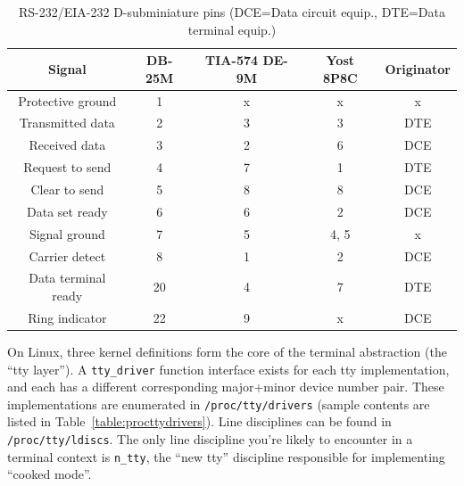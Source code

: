 \begin{table}[!htbp]
  \centering
  \begin{tabular}{ |c|c|c|c|c| }
    \hline
    Signal & DB-25M & TIA-574 DE-9M & Yost 8P8C\cite{yost} & Originator \\
    \hline
    \hline
    Protective ground & 1 & x & x & x \\
    \hline
    Transmitted data & 2 & 3 & 3 & DTE \\
    \hline
    Received data & 3 & 2 & 6 & DCE \\
    \hline
    Request to send & 4 & 7 & 1 & DTE \\
    \hline
    Clear to send & 5 & 8 & 8 & DCE \\
    \hline
    Data set ready & 6 & 6 & 2 & DCE \\
    \hline
    Signal ground & 7 & 5 & 4, 5 & x \\
    \hline
    Carrier detect & 8 & 1 & 2 & DCE \\
    \hline
    Data terminal ready & 20 & 4 & 7 & DTE \\
    \hline
    Ring indicator & 22 & 9 & x & DCE \\
    \hline
  \end{tabular}
  \caption[RS-232/EIA-232 pin mappings]{RS-232/EIA-232 D-subminiature pins (DCE=Data circuit equip., DTE=Data terminal equip.)}
  \label{table:serial}
\end{table}

On Linux, three kernel definitions form the core of the terminal abstraction
(the ``tty layer''). A \texttt{tty\_driver} function interface exists for each
tty implementation, and each has a different corresponding
major+minor device number pair. These implementations are enumerated in
\texttt{/proc/tty/drivers} (sample contents are listed in Table~\ref{table:procttydrivers}).
Line disciplines can be found in \texttt{/proc/tty/ldiscs}. The only line discipline
you're likely to encounter in a terminal context is \texttt{n\_tty}, the ``new tty''
discipline responsible for implementing ``cooked mode''\cite{essentialdrivers}.

